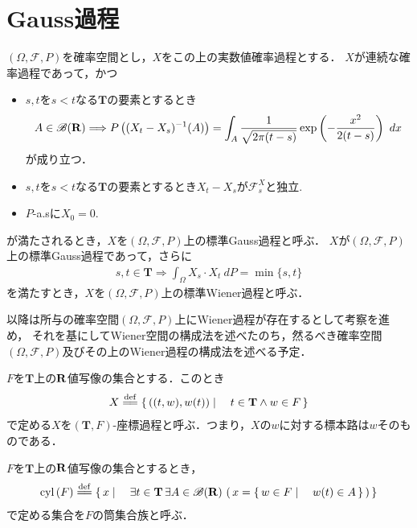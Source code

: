 \section{Gauss過程}
	$(\Omega,\mathscr{F},P)$を確率空間とし，$X$をこの上の実数値確率過程とする．
	$X$が連続な確率過程であって，かつ
	\begin{itemize}
		\item $s,t$を$s < t$なる$\mathbf{T}$の要素とするとき
			\begin{align}
				A \in \mathscr{B}(\mathbf{R}) \Longrightarrow
				P\left((X_t-X_s)^{-1}(A)\right)
				= \int_A \frac{1}{\sqrt{2\pi(t-s)}} \exp\left(-\frac{x^2}{2(t-s)}\right)\ dx
			\end{align}
			が成り立つ．
		
		\item $s,t$を$s < t$なる$\mathbf{T}$の要素とするとき$X_t - X_s$が$\mathscr{F}^X_s$と独立.
			
		\item $P$-a.sに$X_0 = 0$.
	\end{itemize}
	が満たされるとき，$X$を$(\Omega,\mathscr{F},P)$上の標準Gauss過程と呼ぶ．
	$X$が$(\Omega,\mathscr{F},P)$上の標準Gauss過程であって，さらに
	\begin{align}
		s,t \in \mathbf{T} \Longrightarrow \int_\Omega X_s \cdot X_t\ dP = \min{\{s,t\}}
	\end{align}
	を満たすとき，$X$を$(\Omega,\mathscr{F},P)$上の標準Wiener過程と呼ぶ．
	
	以降は所与の確率空間$(\Omega,\mathscr{F},P)$上にWiener過程が存在するとして考察を進め，
	それを基にしてWiener空間の構成法を述べたのち，然るべき確率空間$(\Omega,\mathscr{F},P)$及びその上のWiener過程の構成法を述べる予定．
	
	\begin{screen}
		\begin{dfn}[座標過程]
			$F$を$\mathbf{T}$上の$\mathbf{R}$値写像の集合とする．このとき
			\begin{align}
				X \defeq \Set{((t,w),w(t))}{t \in \mathbf{T} \wedge w \in F}
			\end{align}
			で定める$X$を$(\mathbf{T},F)$-座標過程と呼ぶ．つまり，$X$の$w$に対する標本路は$w$そのものである．
		\end{dfn}
	\end{screen}
	
	\begin{screen}
		\begin{dfn}[筒集合]
			$F$を$\mathbf{T}$上の$\mathbf{R}$値写像の集合とするとき，
			\begin{align}
				\cyl{F} \defeq 
				\Set{x}{\exists t \in \mathbf{T}\, \exists A \in \borel{\R}\, 
				\left(\, x = \Set{w \in F}{w(t) \in A}\, \right)}
			\end{align}
			で定める集合を$F$の筒集合族と呼ぶ．
		\end{dfn}
	\end{screen}
	
